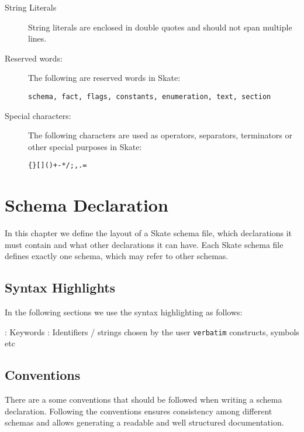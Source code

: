 \documentclass[a4paper,11pt,twoside]{report}
\begin{document}
{{\begin{description}
\item[String Literals] String literals are enclosed in double quotes and should 
  not span multiple lines.


\item[Reserved words:] The following are reserved words in Skate:
\begin{verbatim}
schema, fact, flags, constants, enumeration, text, section
\end{verbatim}


\item[Special characters:] The following characters are used as operators,
  separators, terminators or other special purposes in Skate:
\begin{alltt}

  \{ \} [ ] ( ) + - * / ; , . = 

\end{alltt}

\end{description}



\chapter{Schema Declaration}
\label{chap:declaration}

In this chapter we define the layout of a Skate schema file, which declarations 
it must contain and what other declarations it can have. Each Skate schema file
defines exactly one schema, which may refer to other schemas.

\section{Syntax Highlights}
In the following sections we use the syntax highlighting as follows:
\begin{syntax}
:      Keywords  
:      Identifiers / strings chosen by the user
\verb+verbatim+   constructs, symbols etc
\end{syntax}



\section{Conventions}
There are a some conventions that should be followed when writing a schema 
declaration. Following the conventions ensures consistency among different
schemas and allows generating a readable and well structured documentation.

}}
\end{document}
